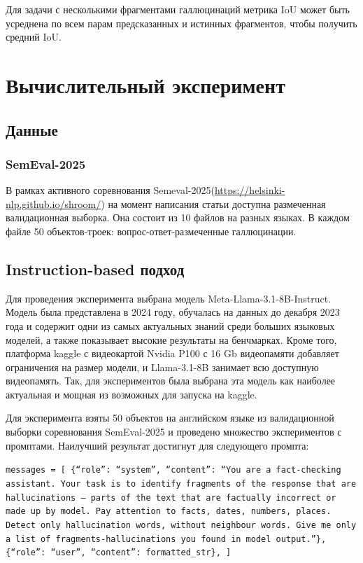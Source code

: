 \documentclass[12pt]{article}
\begin{document}
Для задачи с несколькими фрагментами галлюцинаций метрика IoU может быть усреднена по всем парам предсказанных и истинных фрагментов, чтобы получить средний IoU. 



 
\section{Вычислительный эксперимент}
\subsection{Данные}
\subsubsection{SemEval-2025}
В рамках активного соревнования Semeval-2025(\url{https://helsinki-nlp.github.io/shroom/}) на момент написания статьи доступна размеченная валидационная выборка. Она состоит из 10 файлов на разных языках. В каждом файле 50 объектов-троек: вопрос-ответ-размеченные галлюцинации.
\subsection{Instruction-based подход}
Для проведения эксперимента выбрана модель Meta-Llama-3.1-8B-Instruct. Модель была представлена в 2024 году, обучалась на данных до декабря 2023 года и содержит одни из самых актуальных знаний среди больших языковых моделей, а также показывает высокие результаты на бенчмарках. Кроме того, платформа kaggle с видеокартой Nvidia P100 с 16 Gb видеопамяти добавляет ограничения на размер модели, и Llama-3.1-8B занимает всю доступную видеопамять. Так, для экспериментов была выбрана эта модель как наиболее актуальная и мощная из возможных для запуска на kaggle.

Для эксперимента взяты 50 объектов на английском языке из валидационной выборки соревнования SemEval-2025 и проведено множество экспериментов с промптами. Наилучший результат достигнут для следующего промпта:

\texttt{messages = [
    \{``role'': ``system'', ``content'': ``You are a fact-checking assistant. Your task is to identify fragments of the response that are hallucinations -- parts of the text that are factually incorrect or made up by model. Pay attention to facts, dates, numbers, places. Detect only hallucination words, without neighbour words. Give me only a list of fragments-hallucinations you found in model output.''\},
    \{``role'': ``user'', ``content'': formatted\_str\},
]}
\end{document}

